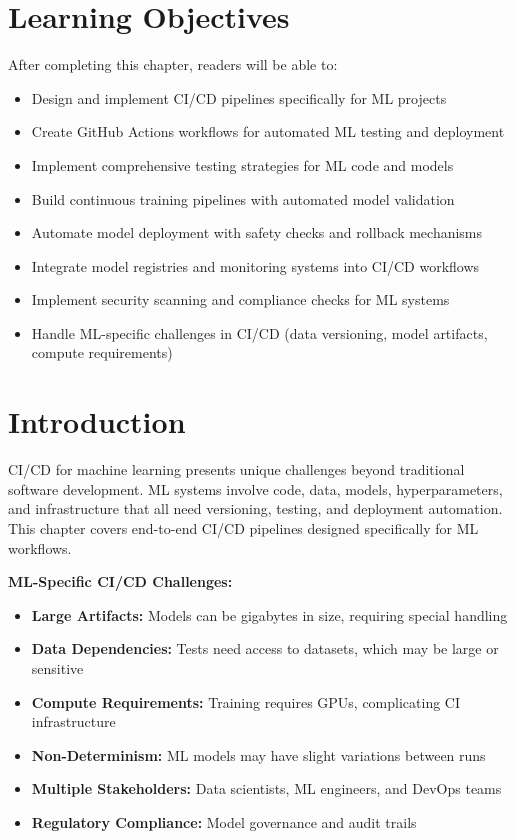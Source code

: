 \section{Learning Objectives}

After completing this chapter, readers will be able to:
\begin{itemize}
    \item Design and implement CI/CD pipelines specifically for ML projects
    \item Create GitHub Actions workflows for automated ML testing and deployment
    \item Implement comprehensive testing strategies for ML code and models
    \item Build continuous training pipelines with automated model validation
    \item Automate model deployment with safety checks and rollback mechanisms
    \item Integrate model registries and monitoring systems into CI/CD workflows
    \item Implement security scanning and compliance checks for ML systems
    \item Handle ML-specific challenges in CI/CD (data versioning, model artifacts, compute requirements)
\end{itemize}

\section{Introduction}

CI/CD for machine learning presents unique challenges beyond traditional software development. ML systems involve code, data, models, hyperparameters, and infrastructure that all need versioning, testing, and deployment automation. This chapter covers end-to-end CI/CD pipelines designed specifically for ML workflows.

\textbf{ML-Specific CI/CD Challenges:}

\begin{itemize}
    \item \textbf{Large Artifacts:} Models can be gigabytes in size, requiring special handling
    \item \textbf{Data Dependencies:} Tests need access to datasets, which may be large or sensitive
    \item \textbf{Compute Requirements:} Training requires GPUs, complicating CI infrastructure
    \item \textbf{Non-Determinism:} ML models may have slight variations between runs
    \item \textbf{Multiple Stakeholders:} Data scientists, ML engineers, and DevOps teams
    \item \textbf{Regulatory Compliance:} Model governance and audit trails
\end{itemize}

